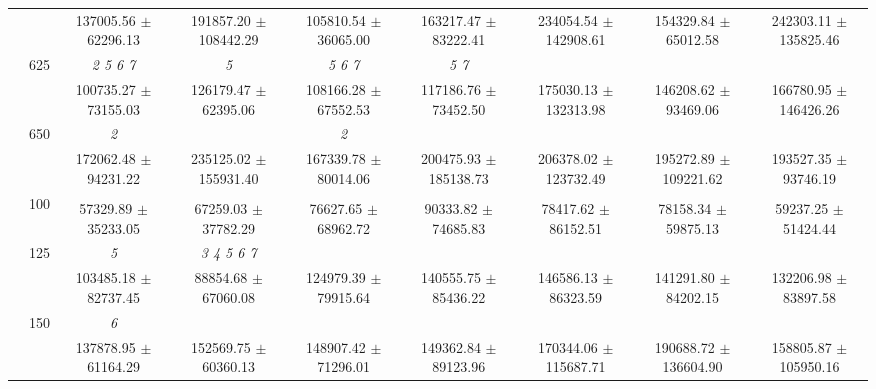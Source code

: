 \begin{table}[h]
{\begin{tabular}{
        ccccccccc}
 & & 137005.56 $\pm$ 62296.13& 191857.20 $\pm$ 108442.29& 105810.54 $\pm$ 36065.00& 163217.47 $\pm$ 83222.41& 234054.54 $\pm$ 142908.61& 154329.84 $\pm$ 65012.58& 242303.11 $\pm$ 135825.46 \\ 
 & \multirow{2}{*}{625}& \cellcolor[HTML]{EFEFEF} \textit{ 2 5 6 7 }& \cellcolor[HTML]{EFEFEF} \textit{ 5 }& \cellcolor[HTML]{EFEFEF} \textit{ 5 6 7 }& \cellcolor[HTML]{EFEFEF} \textit{ 5 7 }& \cellcolor[HTML]{EFEFEF} & \cellcolor[HTML]{EFEFEF} & \cellcolor[HTML]{EFEFEF}  \\ 
 & & \cellcolor[HTML]{EFEFEF} 100735.27 $\pm$ 73155.03& \cellcolor[HTML]{EFEFEF} 126179.47 $\pm$ 62395.06& \cellcolor[HTML]{EFEFEF} 108166.28 $\pm$ 67552.53& \cellcolor[HTML]{EFEFEF} 117186.76 $\pm$ 73452.50& \cellcolor[HTML]{EFEFEF} 175030.13 $\pm$ 132313.98& \cellcolor[HTML]{EFEFEF} 146208.62 $\pm$ 93469.06& \cellcolor[HTML]{EFEFEF} 166780.95 $\pm$ 146426.26 \\ 
 & \multirow{2}{*}{650}& \textit{ 2 }& & \textit{ 2 }& & & &  \\ 
 & & 172062.48 $\pm$ 94231.22& 235125.02 $\pm$ 155931.40& 167339.78 $\pm$ 80014.06& 200475.93 $\pm$ 185138.73& 206378.02 $\pm$ 123732.49& 195272.89 $\pm$ 109221.62& 193527.35 $\pm$ 93746.19 \\ \midrule 
 & \multirow{2}{*}{100}& & & & & & &  \\ 
 & & 57329.89 $\pm$ 35233.05& 67259.03 $\pm$ 37782.29& 76627.65 $\pm$ 68962.72& 90333.82 $\pm$ 74685.83& 78417.62 $\pm$ 86152.51& 78158.34 $\pm$ 59875.13& 59237.25 $\pm$ 51424.44 \\ 
 & \multirow{2}{*}{125}& \cellcolor[HTML]{EFEFEF} \textit{ 5 }& \cellcolor[HTML]{EFEFEF} \textit{ 3 4 5 6 7 }& \cellcolor[HTML]{EFEFEF} & \cellcolor[HTML]{EFEFEF} & \cellcolor[HTML]{EFEFEF} & \cellcolor[HTML]{EFEFEF} & \cellcolor[HTML]{EFEFEF}  \\ 
 & & \cellcolor[HTML]{EFEFEF} 103485.18 $\pm$ 82737.45& \cellcolor[HTML]{EFEFEF} 88854.68 $\pm$ 67060.08& \cellcolor[HTML]{EFEFEF} 124979.39 $\pm$ 79915.64& \cellcolor[HTML]{EFEFEF} 140555.75 $\pm$ 85436.22& \cellcolor[HTML]{EFEFEF} 146586.13 $\pm$ 86323.59& \cellcolor[HTML]{EFEFEF} 141291.80 $\pm$ 84202.15& \cellcolor[HTML]{EFEFEF} 132206.98 $\pm$ 83897.58 \\ 
 & \multirow{2}{*}{150}& \textit{ 6 }& & & & & &  \\ 
 & & 137878.95 $\pm$ 61164.29& 152569.75 $\pm$ 60360.13& 148907.42 $\pm$ 71296.01& 149362.84 $\pm$ 89123.96& 170344.06 $\pm$ 115687.71& 190688.72 $\pm$ 136604.90& 158805.87 $\pm$ 105950.16 \\ 

\end{tabular}}
\end{table}
